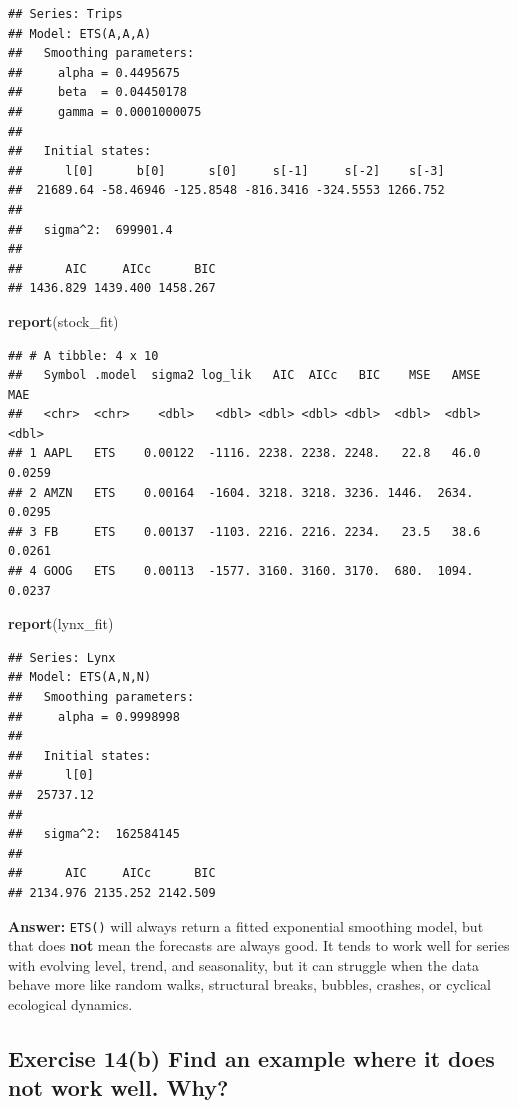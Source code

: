 \documentclass[
  11pt,
]{article}
\newenvironment{Shaded}{\begin{snugshade}}{\end{snugshade}}
\newcommand{\FunctionTok}[1]{\textcolor[rgb]{0.13,0.29,0.53}{\textbf{#1}}}
\newcommand{\NormalTok}[1]{#1}
\begin{document}
\begin{verbatim}
## Series: Trips 
## Model: ETS(A,A,A) 
##   Smoothing parameters:
##     alpha = 0.4495675 
##     beta  = 0.04450178 
##     gamma = 0.0001000075 
## 
##   Initial states:
##      l[0]      b[0]      s[0]     s[-1]     s[-2]    s[-3]
##  21689.64 -58.46946 -125.8548 -816.3416 -324.5553 1266.752
## 
##   sigma^2:  699901.4
## 
##      AIC     AICc      BIC 
## 1436.829 1439.400 1458.267
\end{verbatim}

\begin{Shaded}
\begin{Highlighting}[]
\FunctionTok{report}\NormalTok{(stock\_fit)}
\end{Highlighting}
\end{Shaded}

\begin{verbatim}
## # A tibble: 4 x 10
##   Symbol .model  sigma2 log_lik   AIC  AICc   BIC    MSE   AMSE    MAE
##   <chr>  <chr>    <dbl>   <dbl> <dbl> <dbl> <dbl>  <dbl>  <dbl>  <dbl>
## 1 AAPL   ETS    0.00122  -1116. 2238. 2238. 2248.   22.8   46.0 0.0259
## 2 AMZN   ETS    0.00164  -1604. 3218. 3218. 3236. 1446.  2634.  0.0295
## 3 FB     ETS    0.00137  -1103. 2216. 2216. 2234.   23.5   38.6 0.0261
## 4 GOOG   ETS    0.00113  -1577. 3160. 3160. 3170.  680.  1094.  0.0237
\end{verbatim}

\begin{Shaded}
\begin{Highlighting}[]
\FunctionTok{report}\NormalTok{(lynx\_fit)}
\end{Highlighting}
\end{Shaded}

\begin{verbatim}
## Series: Lynx 
## Model: ETS(A,N,N) 
##   Smoothing parameters:
##     alpha = 0.9998998 
## 
##   Initial states:
##      l[0]
##  25737.12
## 
##   sigma^2:  162584145
## 
##      AIC     AICc      BIC 
## 2134.976 2135.252 2142.509
\end{verbatim}

\textbf{Answer:} \texttt{ETS()} will always return a fitted exponential
smoothing model, but that does \textbf{not} mean the forecasts are
always good. It tends to work well for series with evolving level,
trend, and seasonality, but it can struggle when the data behave more
like random walks, structural breaks, bubbles, crashes, or cyclical
ecological dynamics.

\subsection{Exercise 14(b) Find an example where it does not work well.
Why?}\label{exercise-14b-find-an-example-where-it-does-not-work-well.-why}
\end{document}
